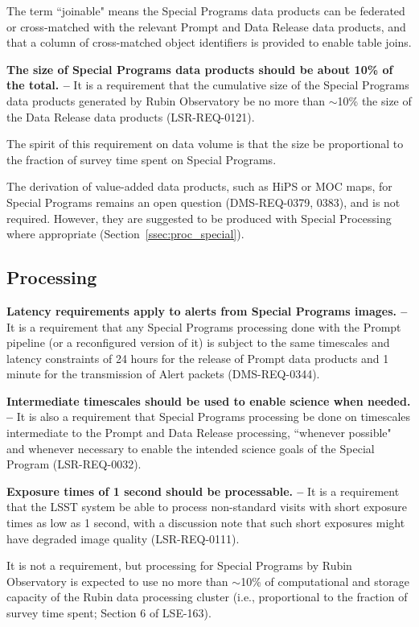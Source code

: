 The term ``joinable" means the Special Programs data products can be federated 
or cross-matched with the relevant Prompt and Data Release data products, and that
a column of cross-matched object identifiers is provided to enable table joins.

\textbf{The size of Special Programs data products should be about 10\% of the total. --}
It is a requirement that the cumulative size of the Special Programs data 
products generated by Rubin Observatory be no more than $\sim$10\% the 
size of the Data Release data products (LSR-REQ-0121).

The spirit of this requirement on data volume is that the size be proportional to the fraction 
of survey time spent on Special Programs.

The derivation of value-added data products, such as HiPS or MOC maps, for 
Special Programs remains an open question (DMS-REQ-0379, 0383), and is not required.
However, they are suggested to be produced with Special Processing where
appropriate (Section~\ref{ssec:proc_special}).

\subsection{Processing}\label{ssec:req_proc}

\textbf{Latency requirements apply to alerts from Special Programs images. --}
It is a requirement that any Special Programs processing done with the 
Prompt pipeline (or a reconfigured version of it) is subject to the same 
timescales and latency constraints of 24 hours for the release of Prompt 
data products and 1 minute for the transmission of Alert packets 
(DMS-REQ-0344).

\textbf{Intermediate timescales should be used to enable science when needed. --}
It is also a requirement that Special Programs processing be done on 
timescales intermediate to the Prompt and Data Release processing, 
``whenever possible" and whenever necessary to enable the intended science 
goals of the Special Program (LSR-REQ-0032).

\textbf{Exposure times of 1 second should be processable. -- }
It is a requirement that the LSST system be able to process non-standard 
visits with short exposure times as low as 1 second, with a discussion 
note that such short exposures might have degraded image quality 
(LSR-REQ-0111).

It is not a requirement, but processing for Special Programs by Rubin Observatory is expected to use no 
more than $\sim$10\% of computational and storage capacity of the Rubin data processing cluster 
(i.e., proportional to the fraction of survey time spent; Section 6 of LSE-163).

